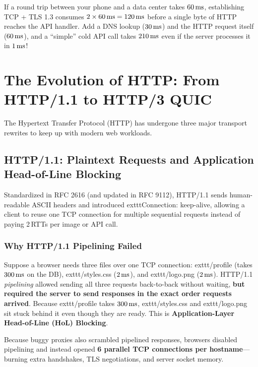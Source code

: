 \begin{intuitionbox}
If a round trip between your phone and a data center takes $60\text{\,ms}$, establishing TCP + TLS 1.3 consumes $2 \times 60\text{\,ms} = 120\text{\,ms}$ before a single byte of HTTP reaches the API handler. Add a DNS lookup ($30\text{\,ms}$) and the HTTP request itself ($60\text{\,ms}$), and a ``simple'' cold API call takes $210\text{\,ms}$ even if the server processes it in $1\text{\,ms}$!
\end{intuitionbox}

\section{The Evolution of HTTP: From HTTP/1.1 to HTTP/3 QUIC}

The Hypertext Transfer Protocol (HTTP) has undergone three major transport rewrites to keep up with modern web workloads.

\subsection{HTTP/1.1: Plaintext Requests and Application Head-of-Line Blocking}

Standardized in RFC 2616 (and updated in RFC 9112), HTTP/1.1 sends human-readable ASCII headers and introduced 	exttt{Connection: keep-alive}, allowing a client to reuse one TCP connection for multiple sequential requests instead of paying 2\,RTTs per image or API call.

\subsubsection{Why HTTP/1.1 Pipelining Failed}
Suppose a browser needs three files over one TCP connection: 	exttt{/profile} (takes $300\text{\,ms}$ on the DB), 	exttt{/styles.css} ($2\text{\,ms}$), and 	exttt{/logo.png} ($2\text{\,ms}$). HTTP/1.1 \emph{pipelining} allowed sending all three requests back-to-back without waiting, \textbf{but required the server to send responses in the exact order requests arrived}. Because 	exttt{/profile} takes $300\text{\,ms}$, 	exttt{/styles.css} and 	exttt{/logo.png} sit stuck behind it even though they are ready. This is \textbf{Application-Layer Head-of-Line (HoL) Blocking}.

Because buggy proxies also scrambled pipelined responses, browsers disabled pipelining and instead opened \textbf{6 parallel TCP connections per hostname}---burning extra handshakes, TLS negotiations, and server socket memory.

